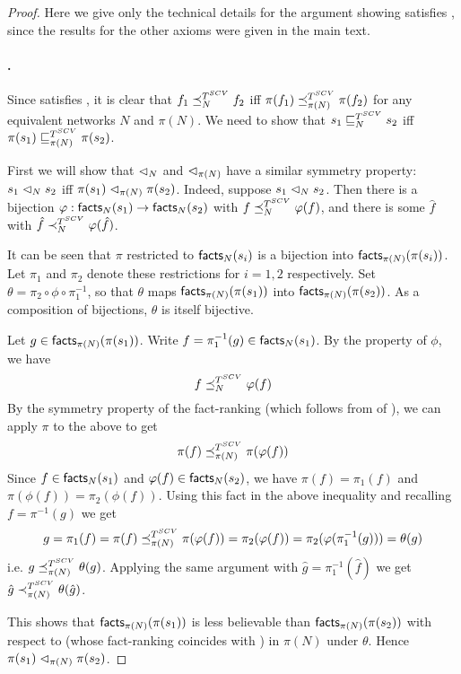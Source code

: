 \begin{proof}

Here we give only the technical details for the argument showing \scvoting{}
    satisfies \symmetry{}, since the results for the other axioms were given in the
main text.

    \paragraph{\symmetry{}.}
    Since \voting{} satisfies \symmetry{}, it is clear that $f_1 \preceq_N^{T^{SCV}} f_2$
iff $\pi(f_1) \preceq_{\pi(N)}^{T^{SCV}} \pi(f_2)$ for any equivalent networks $N$
and $\pi(N)$. We need to show that $s_1 \sqsubseteq_N^{T^{SCV}} s_2$ iff $\pi(s_1)
\sqsubseteq_{\pi(N)}^{T^{SCV}} \pi(s_2)$.

First we will show that $\mathrel{\lhd}_N$ and $\mathrel{\lhd}_{\pi(N)}$ have a similar symmetry
property: $s_1 \mathrel{\lhd}_N s_2$ iff $\pi(s_1) \mathrel{\lhd}_{\pi(N)} \pi(s_2)$. Indeed,
suppose $s_1 \mathrel{\lhd}_N s_2$. Then there is a bijection $\varphi: \mathsf{facts}_N(s_1) \to
\mathsf{facts}_N(s_2)$ with $f \preceq_N^{T^{SCV}} \varphi(f)$, and there is some $\hat{f}$
with $\hat{f} \prec_N^{T^{SCV}} \varphi(\hat{f})$.

It can be seen that $\pi$ restricted to $\mathsf{facts}_N(s_i)$ is a bijection into
$\mathsf{facts}_{\pi(N)}(\pi(s_i))$. Let $\pi_1$ and $\pi_2$ denote these restrictions
for $i=1, 2$ respectively. Set $\theta = \pi_2 \circ \phi \circ \pi_1^{-1}$, so
that $\theta$ maps $\mathsf{facts}_{\pi(N)}(\pi(s_1))$ into
$\mathsf{facts}_{\pi(N)}(\pi(s_2))$. As a composition of bijections, $\theta$ is itself
bijective.

Let $g \in \mathsf{facts}_{\pi(N)}(\pi(s_1))$. Write $f = \pi_1^{-1}(g) \in
\mathsf{facts}_N(s_1)$. By the property of $\phi$, we have
\[
    f \preceq_N^{T^{SCV}} \varphi(f)
\]
    By the symmetry property of the fact-ranking (which follows from
    \symmetry{} of
\voting{}), we can apply $\pi$ to the above to get
\[
    \pi(f) \preceq_{\pi(N)}^{T^{SCV}} \pi(\varphi(f))
\]
Since $f \in \mathsf{facts}_N(s_1)$ and $\varphi(f) \in \mathsf{facts}_N(s_2)$, we have $\pi(f) =
\pi_1(f)$ and $\pi(\phi(f)) = \pi_2(\phi(f))$. Using this fact in the above
inequality and recalling $f = \pi^{-1}(g)$ we get
\[
    g = \pi_1(f) = \pi(f)
    \preceq_{\pi(N)}^{T^{SCV}}
    \pi(\varphi(f)) = \pi_2(\varphi(f)) = \pi_2(\varphi(\pi_1^{-1}(g))) = \theta(g)
\]
i.e. $g \preceq_{\pi(N)}^{T^{SCV}} \theta(g)$. Applying the same argument with
$\hat{g} = \pi_1^{-1}(\hat{f})$ we get $\hat{g} \prec_{\pi(N)}^{T^{SCV}}
\theta(\hat{g})$.

This shows that $\mathsf{facts}_{\pi(N)}(\pi(s_1))$ is less believable than
$\mathsf{facts}_{\pi(N)}(\pi(s_2))$ with respect to \scvoting{} (whose fact-ranking
coincides with \voting{}) in $\pi(N)$ under $\theta$. Hence $\pi(s_1)
\mathrel{\lhd}_{\pi(N)} \pi(s_2)$.


\end{proof}
